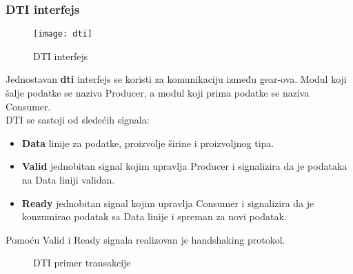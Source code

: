 \subsubsection{DTI interfejs}
\begin{figure}[H]
  \centering
  \texttt{[image: dti]}
  \caption{DTI interfejs\cite{PyGears_OSDA}}
  \label{DTI_intf_img}
\end{figure}

Jednostavan \textbf{\gls{dti}} interfejs se koristi za komunikaciju između gear-ova.
Modul koji šalje podatke se naziva Producer, a modul koji prima podatke se
naziva Consumer. \\
DTI se sastoji od sledećih signala:
\begin{itemize}
\item \textbf{Data} linije za podatke, proizvolje širine i proizvoljnog tipa.
\item \textbf{Valid} jednobitan signal kojim upravlja Producer i signalizira da
  je podataka na Data liniji validan.
\item \textbf{Ready} jednobitan signal kojim upravlja Consumer i signalizira da je
  konzumirao podatak sa Data linije i spreman za novi podatak.
\end{itemize}
Pomoću Valid i Ready signala realizovan je handshaking protokol. \\

\begin{figure}[H]
  \centering{
    \resizebox{0.75\textwidth}{!}{%
      
    }}
  \caption{DTI primer transakcije}
  \label{dti_example1}
\end{figure}

